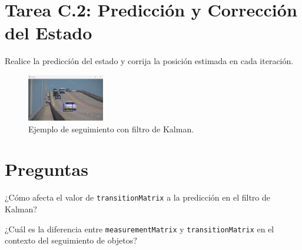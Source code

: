\section*{Tarea C.2: Predicción y Corrección del Estado}
{}
Realice la predicción del estado y corrija la posición estimada en cada iteración.

\begin{figure}[H]
    \centering
    \includegraphics[width=0.3\textwidth]{Lab_4/template/figures/kalman.png}
    \caption{Ejemplo de seguimiento con filtro de Kalman.}
    \label{fig:ejemplo_track_kalman}
\end{figure}

\section*{Preguntas}

\vspace{5mm}
\begin{tcolorbox}[colback=gray!10, colframe=gray!30, coltitle=black, title=Pregunta C.1, halign=left]
¿Cómo afecta el valor de \texttt{transitionMatrix} a la predicción en el filtro de Kalman?
\end{tcolorbox}

\vspace{5mm}
\begin{tcolorbox}[colback=gray!10, colframe=gray!30, coltitle=black, title=Pregunta C.2, halign=left]
¿Cuál es la diferencia entre \texttt{measurementMatrix} y \texttt{transitionMatrix} en el contexto del seguimiento de objetos?
\end{tcolorbox}